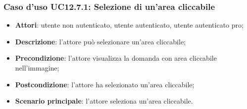 \subsubsection{Caso d'uso UC12.7.1: Selezione di un'area cliccabile}
\begin{itemize}
\item \textbf{Attori}: utente non autenticato, utente autenticato, utente autenticato pro;
\item \textbf{Descrizione}: l'attore può selezionare un'area cliccabile;
\item \textbf{Precondizione}: l'attore visualizza la domanda con area cliccabile nell'immagine;
\item \textbf{Postcondizione}: l'attore ha selezionato un'area cliccabile;
\item \textbf{Scenario principale}: l'attore seleziona un'area cliccabile.
\end{itemize}